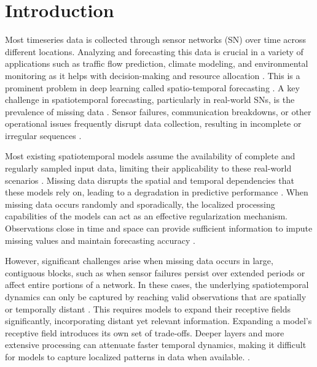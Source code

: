 \documentclass{article}
\theoremstyle{plain}
\theoremstyle{definition}
\theoremstyle{remark}
\begin{document}
\section{Introduction}
Most timeseries data is collected through sensor networks (SN) over time across different locations. Analyzing and forecasting this data is crucial in a variety of applications such as traffic flow prediction, climate modeling, and environmental monitoring as it helps with decision-making and resource allocation \cite{ghaderi2017deep}. This is a prominent problem in deep learning called spatio-temporal forecasting \cite{ghaderi2017deep}. A key challenge in spatiotemporal forecasting, particularly in real-world SNs, is the prevalence of missing data \cite{marisca2024graph, cini2021filling}. Sensor failures, communication breakdowns, or other operational issues frequently disrupt data collection, resulting in incomplete or irregular sequences \cite{marisca2024graph, cini2021filling}. 

Most existing spatiotemporal models assume the availability of complete and regularly sampled input data, limiting their applicability to these real-world scenarios \cite{marisca2024graph}. Missing data disrupts the spatial and temporal dependencies that these models rely on, leading to a degradation in predictive performance \cite{cini2023graph, cini2023graphb}. When missing data occurs randomly and sporadically, the localized processing capabilities of the models can act as an effective regularization mechanism. Observations close in time and space can provide sufficient information to impute missing values and maintain forecasting accuracy \cite{cini2021filling}. 

However, significant challenges arise when missing data occurs in large, contiguous blocks, such as when sensor failures persist over extended periods or affect entire portions of a network. In these cases, the underlying spatiotemporal dynamics can only be captured by reaching valid observations that are spatially or temporally distant \cite{Marisca2022}. This requires models to expand their receptive fields significantly, incorporating distant yet relevant information. Expanding a model’s receptive field introduces its own set of trade-offs. Deeper layers and more extensive processing can attenuate faster temporal dynamics, making it difficult for models to capture localized patterns in data when available. \cite{rusch2023survey}.

\iffalse 
For comments
\fi
\end{document}
